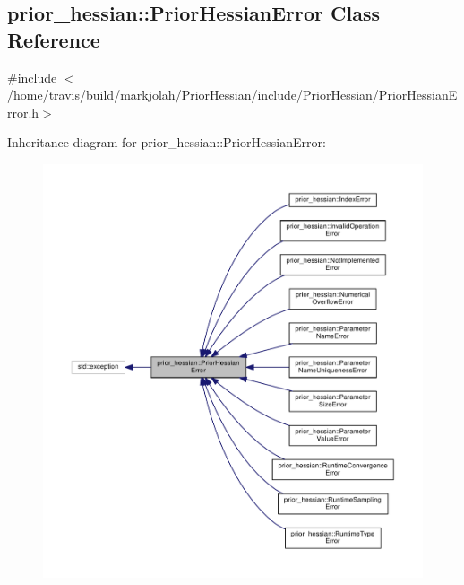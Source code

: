 \hypertarget{classprior__hessian_1_1PriorHessianError}{}\subsection{prior\+\_\+hessian\+:\+:Prior\+Hessian\+Error Class Reference}
\label{classprior__hessian_1_1PriorHessianError}


{\ttfamily \#include $<$/home/travis/build/markjolah/\+Prior\+Hessian/include/\+Prior\+Hessian/\+Prior\+Hessian\+Error.\+h$>$}



Inheritance diagram for prior\+\_\+hessian\+:\+:Prior\+Hessian\+Error\+:\nopagebreak
\begin{figure}[H]
\begin{center}
\leavevmode
\includegraphics[width=350pt]{classprior__hessian_1_1PriorHessianError__inherit__graph}
\end{center}
\end{figure}


